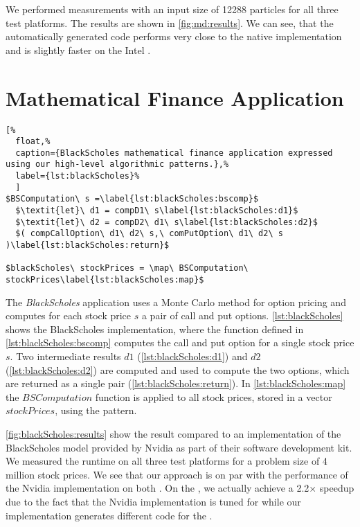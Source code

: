 We performed measurements with an input size of 12288 particles for all three test platforms.
The results are shown in \autoref{fig:md:results}.
We can see, that the automatically generated \OpenCL code performs very close to the native \OpenCL implementation and is slightly faster on the Intel \CPU.



\section{Mathematical Finance Application}

\begin{lstlisting}[%
  float,%
  caption={BlackScholes mathematical finance application expressed using our high-level algorithmic patterns.},%
  label={lst:blackScholes}%
  ]
$BSComputation\ s =\label{lst:blackScholes:bscomp}$
  $\textit{let}\ d1 = compD1\ s\label{lst:blackScholes:d1}$
  $\textit{let}\ d2 = compD2\ d1\ s\label{lst:blackScholes:d2}$
  $( compCallOption\ d1\ d2\ s,\ comPutOption\ d1\ d2\ s )\label{lst:blackScholes:return}$

$blackScholes\ stockPrices = \map\ BSComputation\ stockPrices\label{lst:blackScholes:map}$
\end{lstlisting}

The \emph{BlackScholes} application uses a Monte Carlo method for option pricing and computes for each stock price $s$ a pair of call and put options.
\autoref{lst:blackScholes} shows the BlackScholes implementation, where the function defined in \autoref{lst:blackScholes:bscomp} computes the call and put option for a single stock price $s$.
Two intermediate results $d1$ (\autoref{lst:blackScholes:d1}) and $d2$ (\autoref{lst:blackScholes:d2}) are computed and used to compute the two options, which are returned as a single pair (\autoref{lst:blackScholes:return}).
In \autoref{lst:blackScholes:map} the $BSComputation$ function is applied to all stock prices, stored in a vector $stockPrices$, using the \map pattern.


\autoref{fig:blackScholes:results} show the result compared to an \OpenCL implementation of the BlackScholes model provided by Nvidia as part of their software development kit.
We measured the runtime on all three test platforms for a problem size of 4 million stock prices.
We see that our approach is on par with the performance of the Nvidia implementation on both \GPUs.
On the \CPU, we actually achieve a 2.2$\times$ speedup due to the fact that the Nvidia implementation is tuned for \GPUs while our implementation generates different code for the \CPU.







